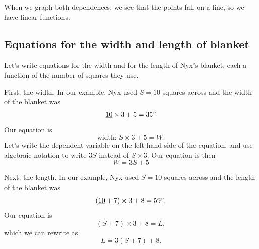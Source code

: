 When we graph both dependences, we see that the points fall on a line, so we have linear functions. 

\begin{center}
\end{center}

\subsection*{Equations for the width and length of blanket}

Let's write equations for the width and for the length of Nyx's blanket, each a function of the number of squares they use.

First, the width.  In our example, Nyx used $S=10$ squares across and the width of the blanket was
$$\underline{10} \times 3 + 5 = 35"$$
Our equation is $$\text{width: }S \times 3 + 5 = W.$$ Let's write the dependent variable on the left-hand side of the equation, and use algebraic notation to write $3S$ instead of $S \times 3$.  Our equation is then $$W = 3S + 5$$

Next, the length. In our example,  Nyx used $S=10$ squares across and the length of the blanket was $$(\underline{10}+7) \times 3+8 = 59".$$
Our equation is $$(S+7) \times 3+8 = L,$$ which we can rewrite as $$L = 3(S+7)+8.$$

